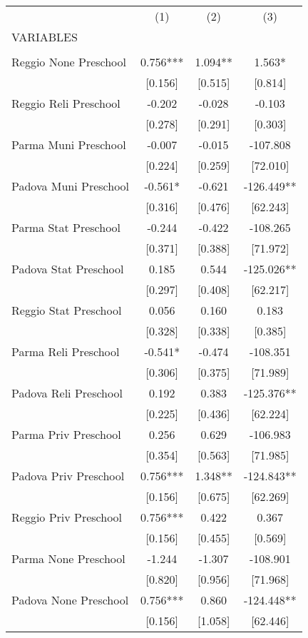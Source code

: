 \begin{tabular}{lccc} \hline
 & (1) & (2) & (3) \\
VARIABLES &  &  &  \\ \hline
 &  &  &  \\
Reggio None Preschool & 0.756*** & 1.094** & 1.563* \\
 & [0.156] & [0.515] & [0.814] \\
Reggio Reli Preschool & -0.202 & -0.028 & -0.103 \\
 & [0.278] & [0.291] & [0.303] \\
Parma Muni Preschool & -0.007 & -0.015 & -107.808 \\
 & [0.224] & [0.259] & [72.010] \\
Padova Muni Preschool & -0.561* & -0.621 & -126.449** \\
 & [0.316] & [0.476] & [62.243] \\
Parma Stat Preschool & -0.244 & -0.422 & -108.265 \\
 & [0.371] & [0.388] & [71.972] \\
Padova Stat Preschool & 0.185 & 0.544 & -125.026** \\
 & [0.297] & [0.408] & [62.217] \\
Reggio Stat Preschool & 0.056 & 0.160 & 0.183 \\
 & [0.328] & [0.338] & [0.385] \\
Parma Reli Preschool & -0.541* & -0.474 & -108.351 \\
 & [0.306] & [0.375] & [71.989] \\
Padova Reli Preschool & 0.192 & 0.383 & -125.376** \\
 & [0.225] & [0.436] & [62.224] \\
Parma Priv Preschool & 0.256 & 0.629 & -106.983 \\
 & [0.354] & [0.563] & [71.985] \\
Padova Priv Preschool & 0.756*** & 1.348** & -124.843** \\
 & [0.156] & [0.675] & [62.269] \\
Reggio Priv Preschool & 0.756*** & 0.422 & 0.367 \\
 & [0.156] & [0.455] & [0.569] \\
Parma None Preschool & -1.244 & -1.307 & -108.901 \\
 & [0.820] & [0.956] & [71.968] \\
Padova None Preschool & 0.756*** & 0.860 & -124.448** \\
 & [0.156] & [1.058] & [62.446] \\

\end{tabular}
